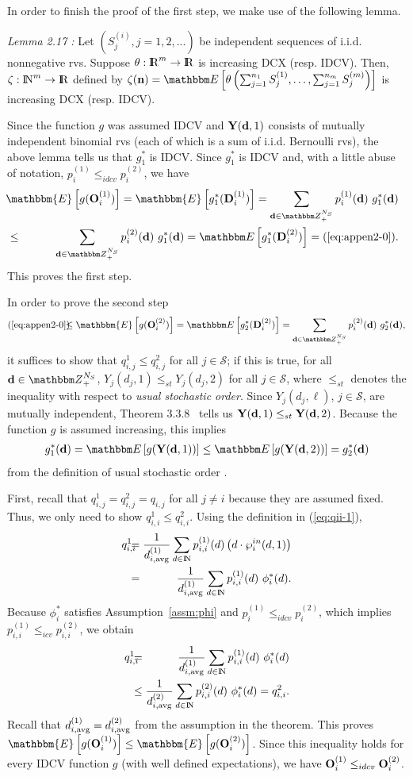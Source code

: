 \documentclass[10pt, journal, compsoc]{IEEEtran}
\newcommand {\cS}{{\mathcal{S}}}
\newcommand {\bO} {{\bf O}}
\newcommand {\bY} {{\bf Y}}
\newcommand {\bd} {{\bf d}}
\newcommand {\bn} {{\bf n}}
\newcommand{\avg}{{\rm avg}}
\newcommand {\Z} {{\mathbbm Z}}
\newcommand {\N} {{\rm I\kern-1.5pt N}}
\newcommand {\R} {{\rm I\kern-2.5pt R}}
\newcommand{\beqan}{\begin{eqnarray*}}
\newcommand{\eeqan}{\end{eqnarray*}}
\newcommand{\myb}{\hspace{-0.1in}}
\newcommand{\myeq}{& \hspace{-0.1in} = & \hspace{-0.1in}}
\newcommand{\lb}{\nonumber \\}
\newcommand{\myleq}{& \myb \leq & \myb}
\newcommand{\E}[1]{{\mathbbm E}\left[ #1 \right]}
\newcommand{\myhb}{\hspace{-0.3in}}
\newcommand{\myskip}{\\ \vspace{-0.1in}}
\begin{document}
In order to finish the proof of the first step, we make
use of the following lemma. 
\myskip

{\em Lemma 2.17 \cite{MeesterShanti}:} Let $\left( S^{(i)}_j, 
j = 1, 2, ... \right)$ be independent sequences of i.i.d. 
nonnegative rvs. Suppose $\theta: \R^m \to \R$
is increasing DCX (resp. IDCV). Then, $\zeta: \N^m \to \R$ 
defined by $\zeta(\bn) = \E{\theta \left( \sum_{j=1}^{n_1} 
S^{(1)}_j, \ldots, \sum_{j=1}^{n_m} S^{(m)}_j \right)}$ 
is increasing DCX (resp. IDCV). 
\myskip


Since the function $g$ was assumed IDCV and $\bY(\bd, 1)$ 
consists of mutually independent binomial rvs (each of which
is a sum of i.i.d. Bernoulli rvs), the above 
lemma tells us that $g^*_1$ is IDCV. Since $g^*_1$ is IDCV 
and, with a little abuse of notation, 
$p^{(1)}_i \leq_{idcv} p^{(2)}_i$, we have 
\beqan
&& \myhb \mathbbm{E}\left[ g(\bO^{(1)}_i) \right]
= \mathbbm{E}\left[ g^*_1({\bf D}^{(1)}_i) \right] 
= \sum_{\bd \in \Z^{N_S}_+} p^{(1)}_i(\bd) \ g^*_1(\bd) \lb
\myleq \sum_{\bd \in \Z^{N_S}_+} p^{(2)}_i(\bd) \ g^*_1(\bd)
= \E{g^*_1({\bf D}^{(2)}_i)}
= (\ref{eq:appen2-0}).
	\label{eq:appen2-2}
\eeqan
This proves the first step. 
	
In order to prove the second step
\beqan 
(\ref{eq:appen2-0}) 
\myleq \mathbbm{E}\left[ g(\bO^{(2)}_i) \right] 
= \E{g^*_2({\bf D}^{(2)}_i)}
= \sum_{\bd \in \Z^{N_S}_+} p^{(2)}_i(\bd) \ g^*_2(\bd), 
\eeqan
it suffices
to show that $q^1_{i,j} \leq q^2_{i,j}$ for all $j \in 
\cS$; if this is true, for all $\bd \in \Z_+^{N_S}$, 
$Y_j(d_j,1) \leq_{st} Y_j(d_j, 2)$ for all $j \in \cS$, 
where $\leq_{st}$ denotes the inequality with respect
to {\em usual stochastic order}.  
Since $Y_j(d_j, \ell)$, $j \in \cS$, are mutually
independent, Theorem 3.3.8~\cite[p. 93]{MullerStoyan}
tells us ${\bf Y}(\bd, 1) \leq_{st} {\bf Y}(\bd, 
2)$. Because the function $g$ is assumed increasing, 
this implies 
\beqan
g^*_1(\bd) 
= \E{g(\bY(\bd, 1))} 
\leq \E{g(\bY(\bd, 2))}
= g^*_2(\bd) 
\eeqan
from the definition of usual stochastic order
\cite{MullerStoyan}. 

First, recall that $q^1_{i,j} = q^2_{i,j} = q_{i,j}$ 
for all $j \neq i$ because they are assumed fixed. 
Thus, we only need to show $q^1_{i,i} \leq q^2_{i,i}$. 
Using the definition in (\ref{eq:qii-1}), 
\beqan
q^1_{i,i}
\myeq \frac{1}{d^{(1)}_{i,\avg}} 
	\sum_{d \in \N} p^{(1)}_{i,i}(d)
	\left( d \cdot \wp^{in}_i(d, 1) \right) \lb
\myeq \frac{1}{d^{(1)}_{i,\avg}} 
	\sum_{d \in \N} p^{(1)}_{i,i}(d)
	\ \phi_i^*(d). 
\eeqan
Because $\phi_i^*$ satisfies Assumption~\ref{assm:phi} 
and $p^{(1)}_i \leq_{idcv} p^{(2)}_i$, which implies 
$p^{(1)}_{i,i} \leq_{icv} p^{(2)}_{i,i}$, we obtain
\beqan
q^1_{i,i} 
\myeq \frac{1}{d^{(1)}_{i,\avg}} 
	\sum_{d \in \N} p^{(1)}_{i,i}(d) \ \phi_i^*(d) \lb
\myleq \frac{1}{d^{(2)}_{i,\avg}} 
	\sum_{d \in \N} p^{(2)}_{i,i}(d) \ \phi_i^*(d) 
	= q^2_{i,i}. 
\eeqan
Recall that $d^{(1)}_{i,\avg} = d^{(2)}_{i,\avg}$
from the assumption in the theorem. 
This proves $\mathbbm{E}\left[ g(\bO^{(1)}_i) 
\right] \leq \mathbbm{E}\left[ g(\bO^{(2)}_i) \right]$.
Since this inequality holds for every IDCV function $g$
(with well defined expectations), we have 
${\bf O}^{(1)}_i \leq_{idcv} {\bf O}^{(2)}_i$. 
\myskip
\end{document}
